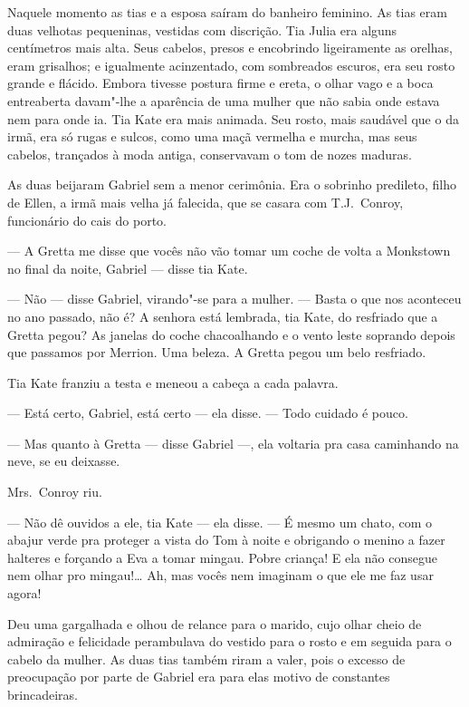 Naquele momento as tias e a esposa saíram do banheiro feminino.  As tias eram
duas velhotas pequeninas, vestidas com discrição.  Tia Julia era alguns
centímetros mais alta.  Seus cabelos, presos e encobrindo ligeiramente as
orelhas, eram grisalhos; e igualmente acinzentado, com sombreados escuros, era
seu rosto grande e flácido.  Embora tivesse postura firme e ereta, o olhar vago
e a boca entreaberta davam"-lhe a aparência de uma mulher que não sabia onde
estava nem para onde ia.  Tia Kate era mais animada.  Seu rosto, mais saudável
que o da irmã, era só rugas e sulcos, como uma maçã vermelha e murcha, mas seus
cabelos, trançados à moda antiga, conservavam o tom de nozes maduras.

As duas beijaram Gabriel sem a menor cerimônia.  Era o sobrinho predileto,
filho de Ellen, a irmã mais velha já falecida, que se casara com T.J.~Conroy,
funcionário do cais do porto.

--- A Gretta me disse que vocês não vão tomar um coche de volta a Monkstown no
final da noite, Gabriel --- disse tia Kate.

--- Não --- disse Gabriel, virando"-se para a mulher.  --- Basta o que nos
aconteceu no ano passado, não é?  A senhora está lembrada, tia Kate, do
resfriado que a Gretta pegou?  As janelas do coche chacoalhando e o vento leste
soprando depois que passamos por Merrion.  Uma beleza.  A Gretta pegou um belo
resfriado.

Tia Kate franziu a testa e meneou a cabeça a cada palavra.

--- Está certo, Gabriel, está certo --- ela disse.  --- Todo cuidado é pouco.

--- Mas quanto à Gretta --- disse Gabriel ---, ela voltaria pra casa caminhando
na neve, se eu deixasse.

Mrs.~Conroy riu.

--- Não dê ouvidos a ele, tia Kate --- ela disse.  --- É mesmo um chato, com o
abajur verde pra proteger a vista do Tom à noite e obrigando o menino a fazer
halteres e forçando a Eva a tomar mingau.  Pobre criança!  E ela não consegue
nem olhar pro mingau!\ldots{}  Ah, mas vocês nem imaginam o que ele me faz usar
agora!

Deu uma gargalhada e olhou de relance para o marido, cujo olhar cheio de
admiração e felicidade perambulava do vestido para o rosto e em seguida para o
cabelo da mulher.  As duas tias também riram a valer, pois o excesso de
preocupação por parte de Gabriel era para elas motivo de constantes
brincadeiras.

